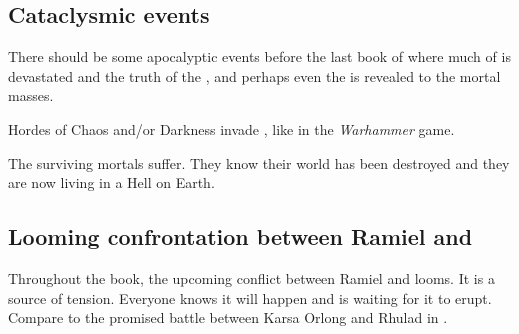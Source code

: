 \subsection{Cataclysmic events}
There should be some apocalyptic events before the last book of \SentinelsofMithEmph where much of \Azmith is devastated and the truth of the \xs, \Iquin and perhaps even the \banes is revealed to the mortal masses. 

Hordes of Chaos and/or Darkness invade \Azmith, like in the \emph{Warhammer} game. 

The surviving mortals suffer.
They know their world has been destroyed and they are now living in a Hell on Earth.










\subsection{Looming confrontation between Ramiel and \Dasteron}
Throughout the book, the upcoming conflict between Ramiel and \Dasteron looms. 
It is a source of tension. 
Everyone knows it will happen and is waiting for it to erupt. 
Compare to the promised battle between Karsa Orlong and Rhulad in \cite{StevenErikson:ReapersGale}. 














